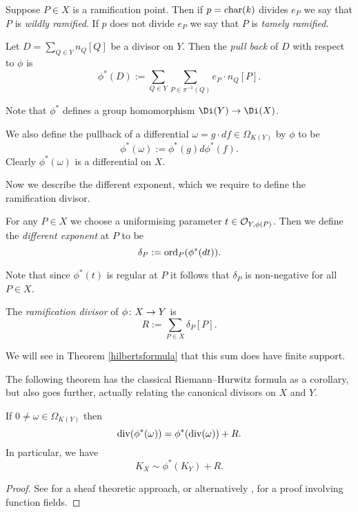     
Suppose $P \in X$ is a ramification point.
Then if $p = \operatorname{char}(k)$ divides $e_P$ we say that $P$ is \emph{wildly ramified}.
If $p$ does not divide $e_P$ we say that $P$ is \emph{tamely ramified}.

    \begin{defn}
    Let $D = \sum_{Q \in Y}n_Q [Q]$ be a divisor on $Y$.
    Then the \emph{pull back} of $D$ with respect to $\phi$ is
        \[
        \phi^*(D) := \sum_{Q \in Y} \sum_{P \in \pi^{-1}(Q)} e_P \cdot n_Q [P].
        \]
    \end{defn}

Note that $\phi^*$ defines a group homomorphism $\Di(Y) \ra \Di(X)$.


We also define the pullback of a differential $\omega = g\cdot df \in \Omega_{K(Y)}$ by $\phi$ to be
    \[
    \phi^*(\omega) := \phi^*(g)d\phi^*(f).
    \]
Clearly $\phi^*(\omega)$ is a differential on $X$.


Now we describe the different exponent, which we require to define the ramification divisor.
    \begin{defn}\label{definitiondifferent}
    For any $P\in X$ we choose a uniformising parameter $t \in {\cal O}_{Y,\phi(P)}$.
    Then we define the \emph{different exponent} at $P$ to be 
        \[
        \delta_P : = \operatorname{ord}_P(\phi^*(dt)).
        \]
    \end{defn}

Note that since $\phi^*(t)$ is regular at $P$ it follows that $\delta_P$ is non-negative for all $P \in X$.
 
    \begin{defn}\label{defnramificationdivisor}
    The \emph{ramification divisor} of $\phi \colon X \rightarrow Y$ is 
        \[
        R:= \sum_{P \in X} \delta_P [P].
        \]
    \end{defn}
We will see in Theorem \ref{hilbertsformula} that this sum does have finite support.

The following theorem has the classical Riemann--Hurwitz formula as a corollary, but also goes further, actually relating the canonical divisors on $X$ and $Y$.
    \begin{thm}\label{theoremdetailedhurwitz}
    If $0 \neq \omega \in \Omega_{K(Y)}$ then
        \begin{equation}\label{equationstronghurwitzformula}
        \operatorname{div}(\phi^*(\omega)) = \phi^*(\operatorname{div}(\omega)) + R.
        \end{equation}
    In particular, we have
        \[
        K_X \sim \phi^*(K_Y) + R.
        \]
    \end{thm}
    \begin{proof}
    See \cite[Chap.\ IV, \S 2, Prop.\ 2.3]{hart} for a sheaf theoretic approach, or alternatively \cite[Thm. 3.4.6]{stichtenoth}, for a proof involving function fields.
    \end{proof}


